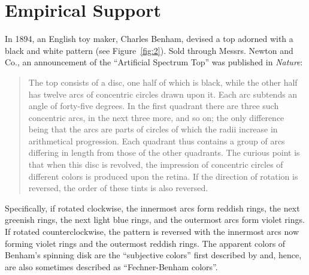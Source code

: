 \section{Empirical Support} %
\label{sec:empirical_support}
In 1894, an English toy maker, Charles Benham, devised a top adorned with a black and white pattern (see Figure~\ref{fig:2}). Sold through Messrs. Newton and Co., an announcement of the ``Artificial Spectrum Top'' was published in \emph{Nature}:
	\begin{quote}
		The top consists of a disc, one half of which is black, while the other half has twelve arcs of concentric circles drawn upon it. Each arc subtends an angle of forty-five degrees. In the first quadrant there are three such concentric arcs, in the next three more, and so on; the only difference being that the arcs are parts of circles of which the radii increase in arithmetical progression. Each quadrant thus contains a group of arcs differing in length from those of the other quadrants. The curious point is that when this disc is revolved, the impression of concentric circles of different colors is produced upon the retina. If the direction of rotation is reversed, the order of these tints is also reversed. \citep{Benham:1894kx}
	\end{quote}
Specifically, if rotated clockwise, the innermost arcs form reddish rings, the next greenish rings, the next light blue rings, and the outermost arcs form violet rings. If rotated counterclockwise, the pattern is reversed with the innermost arcs now forming violet rings and the outermost reddish rings. The apparent colors of Benham's spinning disk are the ``subjective colors'' first described by \citep{Fechner:1838vn} and, hence, are also sometimes described as ``Fechner-Benham colors''.

